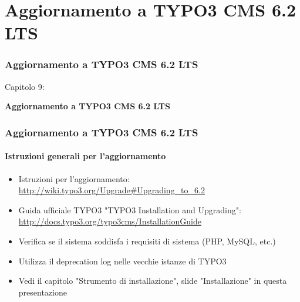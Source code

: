 %

\section{Aggiornamento a TYPO3 CMS 6.2 LTS}
\begin{frame}[fragile]
	\frametitle{Aggiornamento a TYPO3 CMS 6.2 LTS}

	\begin{center}\huge{Capitolo 9:}\end{center}
	\begin{center}\huge{\color{typo3darkgrey}\textbf{Aggiornamento a TYPO3 CMS 6.2 LTS}}\end{center}

\end{frame}


\begin{frame}[fragile]
	\frametitle{Aggiornamento a TYPO3 CMS 6.2 LTS}
	\framesubtitle{Istruzioni generali per l'aggiornamento}

	\begin{itemize}

		\item Istruzioni per l'aggiornamento:\newline
			\smaller\url{http://wiki.typo3.org/Upgrade#Upgrading_to_6.2}\normalsize
		\item Guida ufficiale TYPO3 "TYPO3 Installation and Upgrading":
			\smaller\url{http://docs.typo3.org/typo3cms/InstallationGuide}\normalsize
		\item Verifica se il sistema soddisfa i requisiti di sistema (PHP, MySQL, etc.)
		\item Utilizza il deprecation log nelle vecchie istanze di TYPO3
		\item Vedi il capitolo "Strumento di installazione", slide "Installazione" in questa presentazione

	\end{itemize}

\end{frame}

